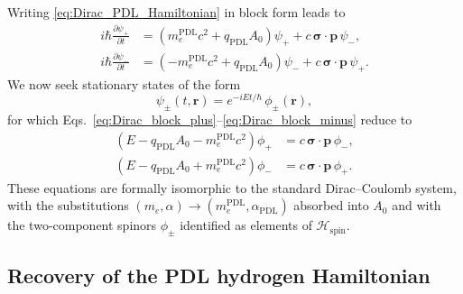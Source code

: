 \documentclass[11pt,a4paper]{article}
\theoremstyle{definition}
\newcommand{\PDL}{\mathrm{PDL}}
\newcommand{\Hspin}{\mathcal{H}_{\mathrm{spin}}}
\newcommand{\alphaPDL}{\alpha_{\mathrm{PDL}}}
\begin{document}
Writing \eqref{eq:Dirac_PDL_Hamiltonian} in block form leads to
\begin{align}
i\hbar \frac{\partial \psi_{+}}{\partial t} &= \left(m_e^{\PDL} c^2 + q_{\PDL} A_0\right)\psi_{+} + c\,\boldsymbol{\sigma}\cdot\mathbf{p}\,\psi_{-}, \label{eq:Dirac_block_plus}\\
i\hbar \frac{\partial \psi_{-}}{\partial t} &= \left(-m_e^{\PDL} c^2 + q_{\PDL} A_0\right)\psi_{-} + c\,\boldsymbol{\sigma}\cdot\mathbf{p}\,\psi_{+}. \label{eq:Dirac_block_minus}
\end{align}
We now seek stationary states of the form
\[
\psi_{\pm}(t,\mathbf{r}) = e^{-i E t/\hbar}\,\phi_{\pm}(\mathbf{r}),
\]
for which Eqs.~\eqref{eq:Dirac_block_plus}--\eqref{eq:Dirac_block_minus} reduce to
\begin{align}
\left(E - q_{\PDL} A_0 - m_e^{\PDL} c^2\right)\phi_{+} &= c\,\boldsymbol{\sigma}\cdot\mathbf{p}\,\phi_{-}, \label{eq:Eqs_phi_plus}\\
\left(E - q_{\PDL} A_0 + m_e^{\PDL} c^2\right)\phi_{-} &= c\,\boldsymbol{\sigma}\cdot\mathbf{p}\,\phi_{+}. \label{eq:Eqs_phi_minus}
\end{align}
These equations are formally isomorphic to the standard Dirac–Coulomb system, with the substitutions $(m_e,\alpha)\to(m_e^{\PDL},\alphaPDL)$ absorbed into $A_0$ and with the two-component spinors $\phi_{\pm}$ identified as elements of $\Hspin$.

\subsection{Recovery of the PDL hydrogen Hamiltonian}
\end{document}
